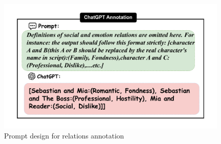 \begin{figure}[ht]
	\centering
	\includegraphics[width=\linewidth]{images/prompt.pdf}
	\caption{Prompt design for relations annotation}
	\label{fig:prompt}
\end{figure}

